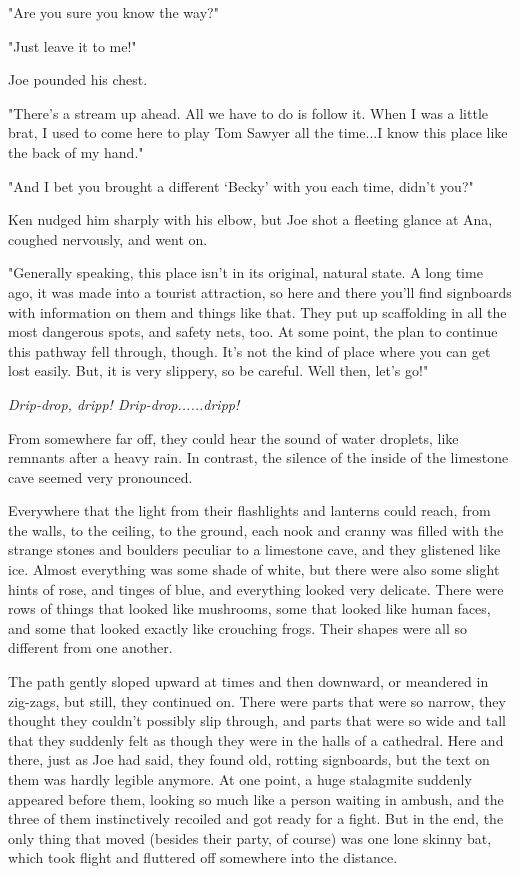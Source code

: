 \documentclass[
]{article}
\begin{document}
"Are you sure you know the way?"

"Just leave it to me!"

Joe pounded his chest.

"There's a stream up ahead. All we have to do is follow it. When I was a
little brat, I used to come here to play Tom Sawyer all the time...I
know this place like the back of my hand."

"And I bet you brought a different `Becky' with you each time, didn't
you?"

Ken nudged him sharply with his elbow, but Joe shot a fleeting glance at
Ana, coughed nervously, and went on.

"Generally speaking, this place isn't in its original, natural state. A
long time ago, it was made into a tourist attraction, so here and there
you'll find signboards with information on them and things like that.
They put up scaffolding in all the most dangerous spots, and safety
nets, too. At some point, the plan to continue this pathway fell
through, though. It's not the kind of place where you can get lost
easily. But, it is very slippery, so be careful. Well then, let's go!"

\emph{Drip-drop, dripp! Drip-drop......dripp!}

From somewhere far off, they could hear the sound of water droplets,
like remnants after a heavy rain. In contrast, the silence of the inside
of the limestone cave seemed very pronounced.

Everywhere that the light from their flashlights and lanterns could
reach, from the walls, to the ceiling, to the ground, each nook and
cranny was filled with the strange stones and boulders peculiar to a
limestone cave, and they glistened like ice. Almost everything was some
shade of white, but there were also some slight hints of rose, and
tinges of blue, and everything looked very delicate. There were rows of
things that looked like mushrooms, some that looked like human faces,
and some that looked exactly like crouching frogs. Their shapes were all
so different from one another.

The path gently sloped upward at times and then downward, or meandered
in zig-zags, but still, they continued on. There were parts that were so
narrow, they thought they couldn't possibly slip through, and parts that
were so wide and tall that they suddenly felt as though they were in the
halls of a cathedral. Here and there, just as Joe had said, they found
old, rotting signboards, but the text on them was hardly legible
anymore. At one point, a huge stalagmite suddenly appeared before them,
looking so much like a person waiting in ambush, and the three of them
instinctively recoiled and got ready for a fight. But in the end, the
only thing that moved (besides their party, of course) was one lone
skinny bat, which took flight and fluttered off somewhere into the
distance.
\end{document}
